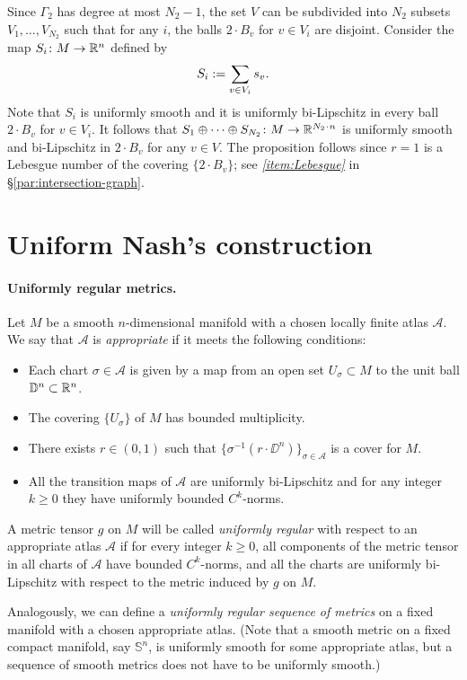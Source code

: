 \documentclass[a4paper,10pt]{article}
\begin{document}
Since $\Gamma_2$ has degree at most $N_2-1$,
the set $V$ can be subdivided into $N_2$ subsets $V_1,\dots, V_{N_2}$ such that 
for any $i$, the balls $2\cdot B_v$ for $v\in V_i$ are disjoint.
Consider the map $S_i\colon M\to\mathbb{R}^n$ defined by
\[S_i\mathrel{{:}{=}}\sum_{v\in V_i}s_v.\]
Note that $S_i$ is uniformly smooth and it is uniformly bi-Lipschitz in every ball $2\cdot B_v$ for $v\in V_i$.
It follows that $S_1\oplus\dots\oplus S_{N_2}\:M\to \RR^{N_2\cdot n}$ is uniformly smooth and bi-Lipschitz in  $2\cdot B_v$ for any $v\in V$.
The proposition follows since $r=1$ is a Lebesgue number of the covering $\{2\cdot B_v\}$; see \textit{\ref{item:Lebesgue}} in §\ref{par:intersection-graph}.
\qeds

\section*{Uniform Nash's construction}

\paragraph{Uniformly regular metrics.}
\label{par:uniformly-regular}
Let $M$ be a smooth $n$-dimensional manifold with a chosen locally finite atlas $\mathcal{A}$.
We say that $\mathcal{A}$ is \emph{appropriate} if it meets the following conditions:
\begin{itemize}
\item Each chart $\sigma\in \mathcal{A}$ is given by a map from an open set $U_\sigma\subset M$ to the unit ball $\mathbb{D}^n\subset \mathbb{R}^n$.
\item The covering $\{U_\sigma\}$ of $M$ has bounded multiplicity.
\item There exists $r\in (0,1)$ such that $\{\sigma^{-1}(r\cdot \DD^n)\}_{\sigma\in\mathcal{A}}$ is a cover for $M$.
\item All the transition maps of $\mathcal{A}$ are uniformly bi-Lipschitz and for any integer $k\ge 0$ they  have uniformly bounded $C^k$-norms. 
\end{itemize}

A metric tensor $g$ on $M$ will be called \emph{uniformly regular} with respect to an appropriate atlas $\mathcal{A}$
if for every integer $k\ge 0$, all components of the metric tensor in all charts of $\mathcal{A}$ have bounded $C^k$-norms,
and all the charts are uniformly bi-Lipschitz with respect to the metric induced by $g$ on $M$. 

Analogously, we can define a \emph{uniformly regular sequence of metrics} on a fixed manifold with a chosen appropriate atlas.
(Note that a smooth metric on a fixed compact manifold, say $\mathbb{S}^n$, is uniformly smooth for some appropriate atlas,
but a sequence of smooth metrics does not have to be uniformly smooth.)
\end{document}
